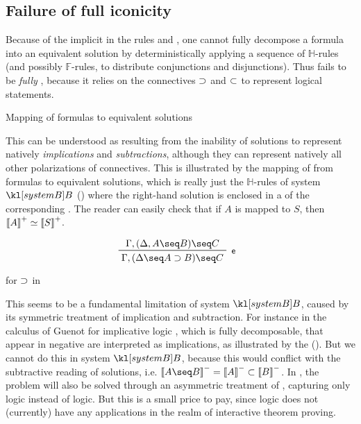 \subsection{Failure of full iconicity}

Because of the implicit  in the rules \rsf{{\limp}{-}} and
\rsf{{\lsub}{+}}, one cannot fully decompose a formula into an equivalent
solution by deterministically applying a sequence of $\mathbb{H}$-rules (and
possibly $\mathbb{F}$-rules, to distribute  conjunctions and 
disjunctions). Thus  fails to be \emph{fully }, because it
relies on the \emph{} connectives $\supset$ and $\subset$ to represent
logical statements.

\begin{marginfigure}
  
  \caption{Mapping of formulas to equivalent solutions}
\end{marginfigure}

This can be understood as resulting from the inability of solutions to represent
natively \emph{ implications} and \emph{ subtractions}, although
they can represent natively all other polarizations of connectives. This is
illustrated by the mapping of  from  formulas to
equivalent solutions, which is really just the $\mathbb{H}$-rules of system
$\sysB$ () where the right-hand solution is enclosed in a
 of the corresponding . The reader can easily check that if $A$ is
mapped to $S$, then $\left\llbracket A \right\rrbracket^+ \simeq \left\llbracket S \right\rrbracket^+$.

\begin{marginfigure}
  $$
  \R[\rsf{e}]
    {\Gamma, (\Delta, A \seq B) \seq C}
    {\Gamma, (\Delta \seq A \limp B) \seq C}
  $$
  \caption{ for $\supset$ in }
\end{marginfigure}

This seems to be a fundamental limitation of system $\sysB$, caused by its
symmetric treatment of implication and subtraction. For instance in the  calculus  of Guenot for implicative logic \cite[Chapter
3]{guenot_nested_2013}, which is fully decomposable,  that appear
in negative  are interpreted as implications, as illustrated by the
  (). But we cannot do this
in system $\sysB$, because this would conflict with the subtractive reading of
 solutions, i.e. $\nsint{A \seq B} = \nsint{A} \lsub \nsint{B}$. In
, the problem will also be solved through an asymmetric treatment
of , capturing only  logic instead of
 logic. But this is a small price to pay, since
 logic does not (currently) have any applications in the
realm of interactive theorem proving.